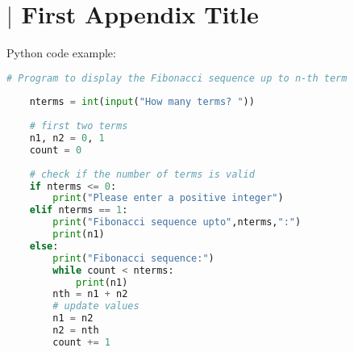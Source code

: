 \chapter{$\vert$ First Appendix Title}
\label{chap:appa}

Python code example:

\begin{lstlisting}[language=Python, caption=Example code]
	# Program to display the Fibonacci sequence up to n-th term
	
	nterms = int(input("How many terms? "))
	
	# first two terms
	n1, n2 = 0, 1
	count = 0
	
	# check if the number of terms is valid
	if nterms <= 0:
		print("Please enter a positive integer")
	elif nterms == 1:
		print("Fibonacci sequence upto",nterms,":")
		print(n1)
	else:
		print("Fibonacci sequence:")
		while count < nterms:
			print(n1)
		nth = n1 + n2
		# update values
		n1 = n2
		n2 = nth
		count += 1
\end{lstlisting}